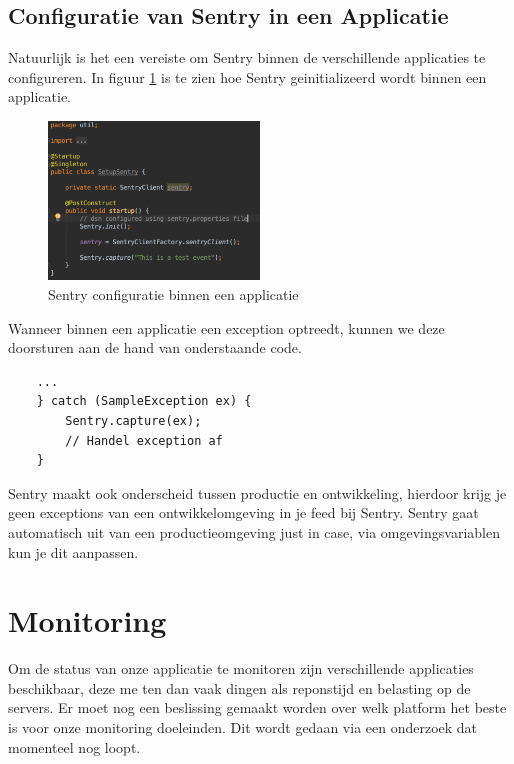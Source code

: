 \subsection{Configuratie van Sentry in een Applicatie}
Natuurlijk is het een vereiste om Sentry binnen de verschillende applicaties te configureren. In figuur \ref{fig:SentryApplicatieConfiguratie} is te zien hoe Sentry geinitializeerd wordt binnen een applicatie.
\begin{figure}[H]
	\centering
	\includegraphics[width=0.50\textwidth]{img/SentryApplicatieConfiguratie.png}
	\caption{Sentry configuratie binnen een applicatie}
	\label{fig:SentryApplicatieConfiguratie}
\end{figure}
Wanneer binnen een applicatie een exception optreedt, kunnen we deze doorsturen aan de hand van onderstaande code.
\begin{lstlisting}
	... 
	} catch (SampleException ex) {
		Sentry.capture(ex);
		// Handel exception af
	}
\end{lstlisting}
Sentry maakt ook onderscheid tussen productie en ontwikkeling, hierdoor krijg je geen exceptions van een ontwikkelomgeving in je feed bij Sentry.
Sentry gaat automatisch uit van een productieomgeving just in case, via omgevingsvariablen kun je dit aanpassen.

\section{Monitoring}
Om de status van onze applicatie te monitoren zijn verschillende applicaties beschikbaar, deze me ten dan vaak dingen als reponstijd en belasting op de servers.
Er moet nog een beslissing gemaakt worden over welk platform het beste is voor onze monitoring doeleinden.
Dit wordt gedaan via een onderzoek dat momenteel nog loopt.